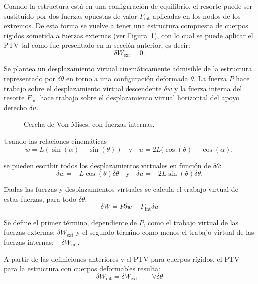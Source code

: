 Cuando la estructura está en una configuración de equilibrio, el resorte puede ser sustituido por dos fuerzas opuestas de valor $F_{\text{int}}$ aplicadas en los nodos de los extremos. %
%
De esta forma se vuelve a tener una estructura compuesta de cuerpos rígidos sometida a fuerzas externas (ver Figura~\ref{fig:CerchaMisesPTV}), con lo cual se puede aplicar el PTV tal como fue presentado en la sección anterior, es decir:
%
\begin{equation}
\delta W_{\text{ext}} = 0.
\end{equation}

Se plantea un desplazamiento virtual cinemáticamente admisible de la estructura representado por $\delta \theta$ en torno a una configuración deformada $\theta$. La fuerza $P$ hace trabajo sobre el desplazamiento virtual descendente $\delta w$ y la fuerza interna del resorte $F_{\text{int}}$ hace trabajo sobre el desplazamiento virtual horizontal del apoyo derecho $\delta u$. 

\begin{figure}[htb]
	\centering
	\def\svgwidth{0.63\textwidth}
	
	\caption{Cercha de Von Mises, con fuerzas internas.}
	\label{fig:CerchaMisesPTV}
\end{figure}

Usando las relaciones cinemáticas
$$
w=L(\sin(\alpha)-\sin(\theta))  \quad \text{y} \quad u=2L(\cos(\theta)-\cos(\alpha),
$$

se pueden escribir todos los desplazamientos virtuales en función de $\delta \theta$:
%
\begin{equation} \label{despvirt}
\delta w = -L\cos(\theta)\delta \theta  \quad \text{y} \quad \delta u = -2L\sin(\theta)\delta \theta.
\end{equation}

Dadas las fuerzas y desplazamientos virtuales se calcula el trabajo virtual de estas fuerzas, para todo $\delta \theta$:
%
\begin{equation}\label{PTVMises}
\delta W = P \delta w - F_{\text{int}} \delta u
\end{equation}

Se define el primer término, dependiente de $P$, como el trabajo virtual de las fuerzas externas: $\delta W_{\text{ext}}$ y el segundo término como menos el trabajo virtual de las fuerzas internas: $-\delta W_{\text{int}}$.

A partir de las definiciones anteriores y el PTV para cuerpos rígidos, el PTV para la estructura con cuerpos deformables resulta:
%
\begin{equation}
\delta W_{\text{int}} = \delta W_{\text{ext}} \qquad \forall \delta \theta
\end{equation}

